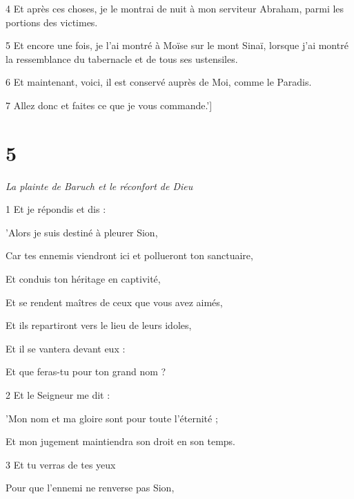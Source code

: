 \par 4 Et après ces choses, je le montrai de nuit à mon serviteur Abraham, parmi les portions des victimes.

\par 5 Et encore une fois, je l'ai montré à Moïse sur le mont Sinaï, lorsque j'ai montré la ressemblance du tabernacle et de tous ses ustensiles.

\par 6 Et maintenant, voici, il est conservé auprès de Moi, comme le Paradis.

\par 7 Allez donc et faites ce que je vous commande.']

\chapter{5}

\par \textit{La plainte de Baruch et le réconfort de Dieu}

\par 1 Et je répondis et dis :

\par 'Alors je suis destiné à pleurer Sion,

\par Car tes ennemis viendront ici et pollueront ton sanctuaire,

\par Et conduis ton héritage en captivité,

\par Et se rendent maîtres de ceux que vous avez aimés,

\par Et ils repartiront vers le lieu de leurs idoles,

\par Et il se vantera devant eux :

\par Et que feras-tu pour ton grand nom ?

\par 2 Et le Seigneur me dit :

\par 'Mon nom et ma gloire sont pour toute l'éternité ;

\par Et mon jugement maintiendra son droit en son temps.

\par 3 Et tu verras de tes yeux

\par Pour que l'ennemi ne renverse pas Sion,

